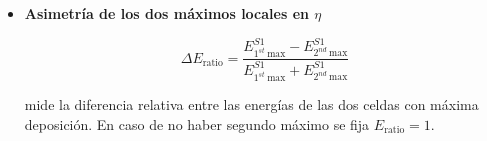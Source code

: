 \begin{itemize}
	\item  \textbf{Asimetría de los dos máximos locales en $\eta$}

		\begin{equation}
		\Delta E_{\text{ratio}}=\frac{E_{1^{st} \:\text{max}}^{S1} - E_{2^{nd} \:\text{max}}^{S1}}{E_{1^{st} \:\text{max}}^{S1} + E_{2^{nd} \:\text{max}}^{S1}}
		\end{equation}
 
 		mide la diferencia relativa entre las energías de las dos celdas con máxima deposición. En caso de no haber segundo máximo se fija $E_{\text{ratio}} = 1$.


\end{itemize}

\renewcommand{\arraystretch}{1.0}
\begin{table}	
\centering
\caption{Detalle de las diferentes variables usadas para la selección \textit{loose} (L) y \textit{tight} (T) de fotones y electrones. El $\checkmark$ indica cuándo la selección requiere de esa variable. \cite{ATLAS:2016iqc} \cite{Tripiana:1433788}}
\end{table}
